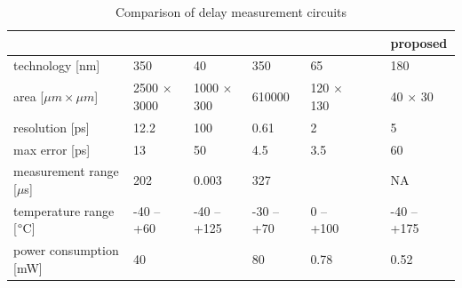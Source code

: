 \begin{table}[htp]
    \centering
    \caption{Comparison of delay measurement circuits}
    \label{tbl:delay-measurement-comparison}
    \begin{tabular}{@{}llllllll@{}}
    \toprule
                                      & \cite{1637593} & \cite{6233014} & \cite{7312496} & \cite{7560219} &  &  & \textbf{proposed} \\ \midrule
    technology  [nm]                  & 350         & 40          & 350        & 65        &  &  & 180              \\
    area [\(\mu m \times \mu m\)]     & 2500 $\times$ 3000 & 1000 $\times$ 300  & 610000     & 120 $\times$ 130 &  &  & 40 $\times$ 30           \\
    resolution [ps]                   & 12.2        & 100         & 0.61       & 2         &  &  & 5\footnotemark                 \\
    max error [ps]                    & 13          & 50          & 4.5        & 3.5       &  &  & 60             \\
    measurement range [\(\mu\)s]      & 202         & 0.003       & 327        &           &  &  & NA             \\
    temperature range [\(\degree \)C] & -40 -- +60  & -40 -- +125 & -30 -- +70 & 0 -- +100 &  &  & -40 -- +175       \\
    power consumption [mW]            & 40          &             & 80         & 0.78      &  &  & 0.52              \\ \bottomrule
    \end{tabular}
\end{table}

